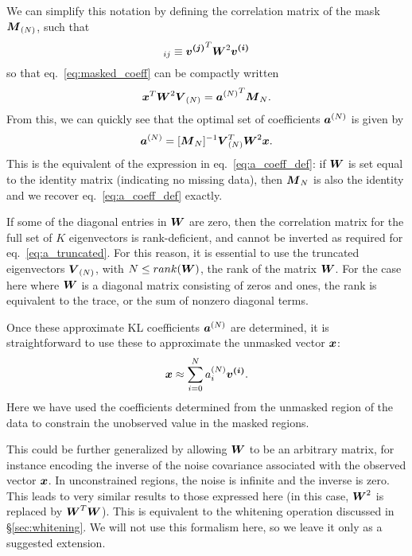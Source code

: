 We can simplify this notation by defining the correlation matrix of the
mask $\boldsymbol{M}_{(N)}$, such that
\begin{equation}
  [\mymat{M}_N]_{ij} \equiv \myvec{v^{(j)}}^T \mymat{W}^2 \mymat{v^{(i)}}
\end{equation}
so that eq.~\ref{eq:masked_coeff} can be compactly written
\begin{equation}
  \boldsymbol{x}^T \boldsymbol{W}^2 \boldsymbol{V}_{(N)}
  = {\boldsymbol{a}^{(N)}}^T \boldsymbol{M}_N.
\end{equation}
From this, we can quickly see that the optimal set of coefficients
$\boldsymbol{a}^{(N)}$ is given by
\begin{equation}
  \label{eq:a_truncated}
  \boldsymbol{a}^{(N)} = [\boldsymbol{M}_N]^{-1}
  \boldsymbol{V}_{(N)}^T \boldsymbol{W}^2 \boldsymbol{x}.
\end{equation}
This is the equivalent of the expression in eq.~\ref{eq:a_coeff_def}:
if $\boldsymbol{W}$ is set equal to the identity matrix (indicating no
missing data), then $\boldsymbol{M}_N$ is also the identity and we recover
eq.~\ref{eq:a_coeff_def} exactly.

If some of the diagonal entries in $\boldsymbol{W}$ are zero, then the
correlation matrix for the full set of $K$ eigenvectors is rank-deficient,
and cannot be inverted as required for eq.~\ref{eq:a_truncated}.  For this
reason, it is essential to use the truncated eigenvectors $\boldsymbol{V}_{(N)}$,
with $N \le rank(\boldsymbol{W})$, the rank of the matrix $\boldsymbol{W}$.  For the
case here where $\boldsymbol{W}$ is a diagonal matrix consisting of zeros and
ones, the rank is equivalent to the trace, or the sum of nonzero diagonal
terms.

Once these approximate KL coefficients $\boldsymbol{a}^{(N)}$ are determined,
it is straightforward to use these to approximate the unmasked vector
$\boldsymbol{x}$:
\begin{equation}
  \boldsymbol{x} \approx \sum_{i=0}^N a_i^{(N)} \boldsymbol{v^{(i)}}.
\end{equation}
Here we have used the coefficients determined from the unmasked region of
the data to constrain the unobserved value in the masked regions.

This could be further generalized by allowing $\boldsymbol{W}$ to be an arbitrary
matrix, for instance encoding the inverse of the noise covariance
associated with the observed vector $\boldsymbol{x}$.  In unconstrained regions,
the noise is infinite and the inverse is zero.  This leads to very similar
results to those expressed here (in this case, $\boldsymbol{W}^2$ is replaced
by $\boldsymbol{W}^T\boldsymbol{W}$).  This is equivalent to the whitening operation
discussed in \S\ref{sec:whitening}.  We will not use this formalism here, so we
leave it only as a suggested extension.

